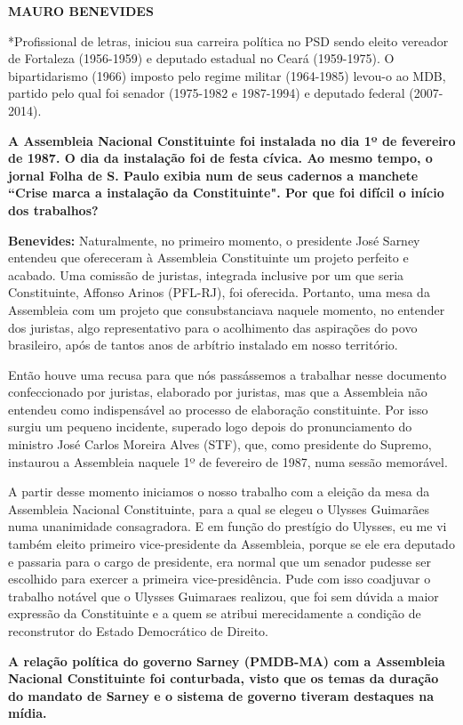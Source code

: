 \textbf{MAURO BENEVIDES}

*Profissional de letras, iniciou sua carreira política no PSD sendo
eleito vereador de Fortaleza (1956-1959) e deputado estadual no Ceará
(1959-1975). O bipartidarismo (1966) imposto pelo regime militar
(1964-1985) levou-o ao MDB, partido pelo qual foi senador (1975-1982 e
1987-1994) e deputado federal (2007-2014).

\textbf{A Assembleia Nacional Constituinte foi instalada no dia 1º de
fevereiro de 1987. O dia da instalação foi de festa cívica. Ao mesmo
tempo, o jornal Folha de S. Paulo exibia num de seus cadernos a manchete
``Crise marca a instalação da Constituinte". Por que foi difícil o
início dos trabalhos?}

\textbf{Benevides:} Naturalmente, no primeiro momento, o presidente José
Sarney entendeu que ofereceram à Assembleia Constituinte um projeto
perfeito e acabado. Uma comissão de juristas, integrada inclusive por um
que seria Constituinte, Affonso Arinos (PFL-RJ), foi oferecida.
Portanto, uma mesa da Assembleia com um projeto que consubstanciava
naquele momento, no entender dos juristas, algo representativo para o
acolhimento das aspirações do povo brasileiro, após de tantos anos de
arbítrio instalado em nosso território.

Então houve uma recusa para que nós passássemos a trabalhar nesse
documento confeccionado por juristas, elaborado por juristas, mas que a
Assembleia não entendeu como indispensável ao processo de elaboração
constituinte. Por isso surgiu um pequeno incidente, superado logo depois
do pronunciamento do ministro José Carlos Moreira Alves (STF), que, como
presidente do Supremo, instaurou a Assembleia naquele 1º de fevereiro de
1987, numa sessão memorável.

A partir desse momento iniciamos o nosso trabalho com a eleição da mesa
da Assembleia Nacional Constituinte, para a qual se elegeu o Ulysses
Guimarães numa unanimidade consagradora. E em função do prestígio do
Ulysses, eu me vi também eleito primeiro vice-presidente da Assembleia,
porque se ele era deputado e passaria para o cargo de presidente, era
normal que um senador pudesse ser escolhido para exercer a primeira
vice-presidência. Pude com isso coadjuvar o trabalho notável que o
Ulysses Guimaraes realizou, que foi sem dúvida a maior expressão da
Constituinte e a quem se atribui merecidamente a condição de
reconstrutor do Estado Democrático de Direito.

\textbf{A relação política do governo Sarney (PMDB-MA) com a Assembleia
Nacional Constituinte foi conturbada, visto que os temas da duração do
mandato de Sarney e o sistema de governo tiveram destaques na mídia.}

